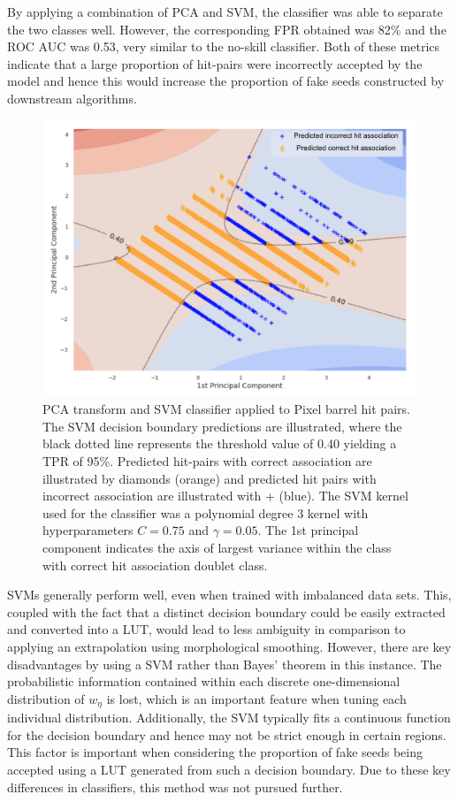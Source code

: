 By applying a combination of PCA and SVM, the classifier was able to separate the two classes well. However, the corresponding FPR obtained was 82\% and the ROC AUC was 0.53, very similar to the no-skill classifier. Both of these metrics indicate that a large proportion of hit-pairs were incorrectly accepted by the model and hence this would increase the proportion of fake seeds constructed by downstream algorithms.

\begin{figure}[htbp]
\centering
\includegraphics[width=1.0\linewidth]{images/4-ml-based-predictor/barrel-svm-pca.png}
\caption{PCA transform and SVM classifier applied to Pixel barrel hit pairs. The SVM decision boundary predictions are illustrated, where the black dotted line represents the threshold value of 0.40 yielding a TPR of 95\%. Predicted hit-pairs with correct association are illustrated by diamonds (orange) and predicted hit pairs with incorrect association are illustrated with + (blue). The SVM kernel used for the classifier was a polynomial degree 3 kernel with hyperparameters $C=0.75$ and $\gamma=0.05$. The 1st principal component indicates the axis of largest variance within the class with correct hit association doublet class.}
\label{fig:barrel-svm-pca}
\end{figure}

SVMs generally perform well, even when trained with imbalanced data sets. This, coupled with the fact that a distinct decision boundary could be easily extracted and converted into a LUT, would lead to less ambiguity in comparison to applying an extrapolation using morphological smoothing. However, there are key disadvantages by using a SVM rather than Bayes' theorem in this instance. The probabilistic information contained within each discrete one-dimensional distribution of $w_{\eta}$ is lost, which is an important feature when tuning each individual distribution. Additionally, the SVM typically fits a continuous function for the decision boundary and hence may not be strict enough in certain regions. This factor is important when considering the proportion of fake seeds being accepted using a LUT generated from such a decision boundary. Due to these key differences in classifiers, this method was not pursued further.


